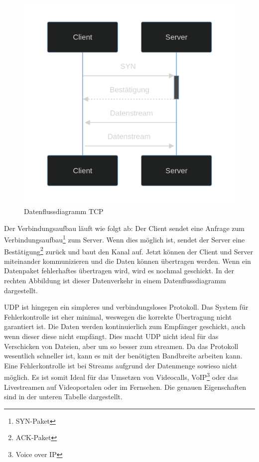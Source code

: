 \documentclass[12pt]{article}
\begin{document}
\begin{figure}
	\centering
	\includegraphics[scale=0.15]{Bilder/Datenfluss_TCP}
	\caption{Datenflussdiagramm TCP\cite{datenflussdiagramm-tcp}}
	\label{fig:figure6}
\end{figure}

Der Verbindungsaufbau läuft wie folgt ab: 
Der Client sendet eine Anfrage zum Verbindungsaufbau\footnote{SYN-Paket} zum Server. Wenn dies möglich ist, sendet der Server eine Bestätigung\footnote{ACK-Paket} zurück und baut den Kanal auf. Jetzt können der Client und Server miteinander kommunizieren und die Daten können übertragen werden. Wenn ein Datenpaket fehlerhaftes übertragen wird, wird es nochmal geschickt. In der rechten Abbildung ist dieser Datenverkehr in einem Datenflussdiagramm dargestellt. 

UDP ist hingegen ein simpleres und verbindungsloses Protokoll. Das System für Fehlerkontrolle ist eher minimal, weswegen die korrekte Übertragung nicht garantiert ist. Die Daten werden kontinuierlich zum Empfänger geschickt, auch wenn dieser diese nicht empfängt. Dies macht UDP nicht ideal für das Verschicken von Dateien, aber um so besser zum streamen. Da das Protokoll wesentlich schneller ist, kann es mit der benötigten Bandbreite arbeiten kann. Eine Fehlerkontrolle ist bei Streams aufgrund der Datenmenge sowieso nicht möglich. Es ist somit Ideal für das Umsetzen von Videocalls, VoIP\footnote{Voice over IP} oder das Livestreamen auf Videoportalen oder im Fernsehen.\cite{udp} Die genauen Eigenschaften sind in der unteren Tabelle dargestellt. 
\end{document}
